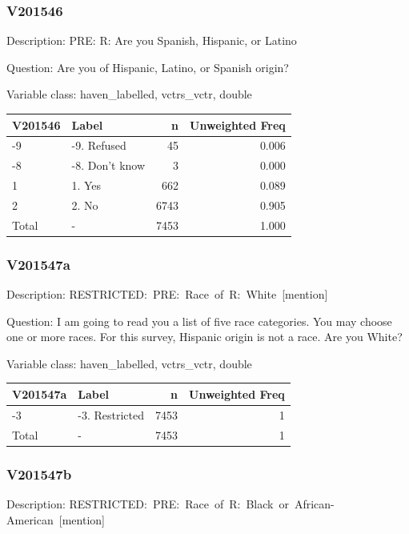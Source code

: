 \documentclass[
]{krantz}
\begin{document}
\hypertarget{v201546}{%
\subsubsection*{V201546}\label{v201546}}


Description: PRE: R: Are you Spanish, Hispanic, or Latino

Question: Are you of Hispanic, Latino, or Spanish origin?

Variable class: haven\_labelled, vctrs\_vctr, double

\begin{tabular}[t]{l|l|r|r}
\hline
V201546 & Label & n & Unweighted Freq\\
\hline
-9 & -9. Refused & 45 & 0.006\\
\hline
-8 & -8. Don't know & 3 & 0.000\\
\hline
1 & 1. Yes & 662 & 0.089\\
\hline
2 & 2. No & 6743 & 0.905\\
\hline
Total & - & 7453 & 1.000\\
\hline
\end{tabular}

\hypertarget{v201547a}{%
\subsubsection*{V201547a}\label{v201547a}}


Description: RESTRICTED:~PRE:~Race~of~R:~White~{[}mention{]}

Question: I am going to read you a list of five race categories. You may choose one or more races. For this survey, Hispanic origin is not a race. Are you White?

Variable class: haven\_labelled, vctrs\_vctr, double

\begin{tabular}[t]{l|l|r|r}
\hline
V201547a & Label & n & Unweighted Freq\\
\hline
-3 & -3. Restricted & 7453 & 1\\
\hline
Total & - & 7453 & 1\\
\hline
\end{tabular}

\hypertarget{v201547b}{%
\subsubsection*{V201547b}\label{v201547b}}


Description: RESTRICTED:~PRE:~Race~of~R:~Black~or~African-American~{[}mention{]}
\end{document}
